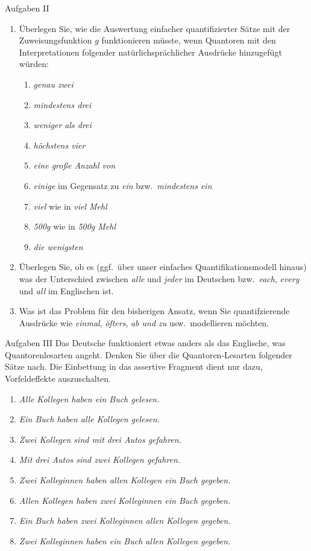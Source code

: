 \begin{frame}
  {Aufgaben II}
  \begin{enumerate}
    \item Überlegen Sie, wie die Auswertung einfacher quantifizierter Sätze mit der Zuweisungsfunktion $g$ funktionieren müsste, wenn Quantoren mit den Interpretationen folgender natürlichsprächlicher Ausdrücke hinzugefügt würden:
      \begin{enumerate}
        \item \textit{genau zwei}
        \item \textit{mindestens drei}
        \item \textit{weniger als drei}
        \item \textit{höchstens vier}
        \item \textit{eine große Anzahl von}
        \item \textit{einige} im Gegensatz zu \textit{ein} bzw.\ \textit{mindestens ein}
        \item \textit{viel} wie in \textit{viel Mehl}
        \item \textit{500g} wie in \textit{500g Mehl}
        \item \textit{die wenigsten}
      \end{enumerate}
      \Halbzeile
    \item Überlegen Sie, ob es (ggf.\ über unser einfaches Quantifikationsmodell hinaus) was der Unterschied zwischen \textit{alle} und \textit{jeder} im Deutschen bzw.\ \textit{each}, \textit{every} und \textit{all} im Englischen ist.
      \Halbzeile
    \item Was ist das Problem für den bisherigen Ansatz, wenn Sie quantifzierende Ausdrücke wie \textit{einmal}, \textit{öfters}, \textit{ab und zu} usw.\ modellieren möchten.
  \end{enumerate}
\end{frame}

\begin{frame}
  {Aufgaben III}
  Das Deutsche funktioniert etwas anders als das Englische, was Quantorenlesarten angeht. Denken Sie über die Quantoren-Lesarten folgender Sätze nach. Die Einbettung in das assertive Fragment dient nur dazu, Vorfeldeffekte auszuschalten.
  \Halbzeile
  \begin{enumerate}[<+->]
    \item \textit{Alle Kollegen haben ein Buch gelesen.}
    \item \textit{Ein Buch haben alle Kollegen gelesen.}
    \item \textit{Zwei Kollegen sind mit drei Autos gefahren.}
    \item \textit{Mit drei Autos sind zwei Kollegen gefahren.}
    \item \textit{Zwei Kolleginnen haben allen Kollegen ein Buch gegeben.}
    \item \textit{Allen Kollegen haben zwei Kolleginnen ein Buch gegeben.}
    \item \textit{Ein Buch haben zwei Kolleginnen allen Kollegen gegeben.}
    \item \textit{Zwei Kolleginnen haben ein Buch allen Kollegen gegeben.}
  \end{enumerate}
\end{frame}


